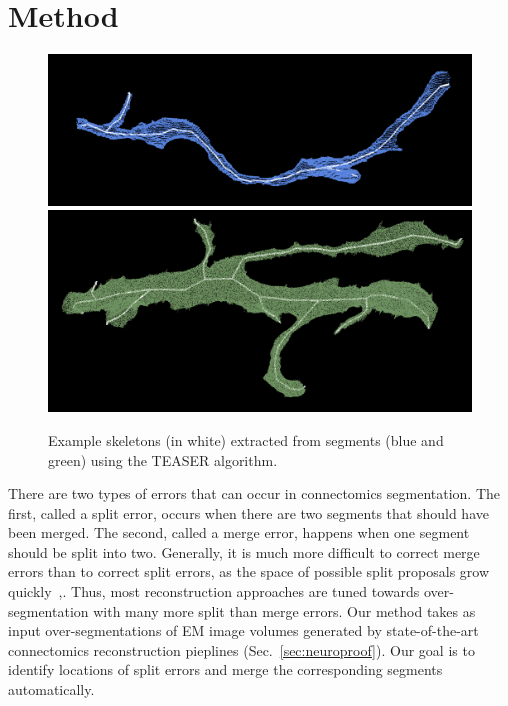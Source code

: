 \section{Method}

\begin{figure}[t]
	\centering
	\includegraphics[width=0.92\linewidth]{./figures/skeleton1.png}
	\includegraphics[width=0.92\linewidth]{./figures/skeleton2.png}
	\caption{Example skeletons (in white) extracted from segments (blue and green) using the TEASER algorithm.}
	\label{fig:skeletonization}
\end{figure}

There are two types of errors that can occur in connectomics segmentation.
The first, called a split error, occurs when there are two segments that should have been merged. The second, called a merge error, happens when one segment should be split into two. Generally, it is much more difficult to correct merge errors than to correct split errors,
as the space of possible split proposals grow quickly~\cite{parag2015properties},.
Thus, most reconstruction approaches are tuned towards over-segmentation with many more split than merge errors. Our method takes as input over-segmentations of EM image volumes generated by state-of-the-art connectomics reconstruction pieplines (Sec.~\ref{sec:neuroproof}). Our goal is to identify locations of split errors and merge the corresponding segments automatically.


